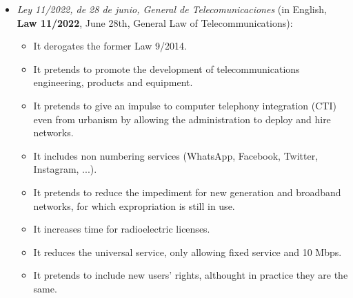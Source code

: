\documentclass[../main.tex]{subfiles}
\begin{document}
\begin{itemize}
	\item {
		\textit{Ley 11/2022, de 28 de junio, General de Telecomunicaciones} (in English, \textbf{Law 11/2022}, June 28th, General Law of Telecommunications):
		\begin{itemize}
			\item It derogates the former Law 9/2014.
			\item It pretends to promote the development of telecommunications engineering, products and equipment.
			\item It pretends to give an impulse to computer telephony integration (CTI) even from urbanism by allowing the administration to deploy and hire networks.
			\item It includes non numbering services (WhatsApp, Facebook, Twitter, Instagram, ...).
			\item It pretends to reduce the impediment for new generation and broadband networks, for which expropriation is still in use.
			\item It increases time for radioelectric licenses.
			\item It reduces the universal service, only allowing fixed service and 10 Mbps.
			\item It pretends to include new users' rights, althought in practice they are the same.
		\end{itemize}
	}
\end{itemize}
\end{document}
